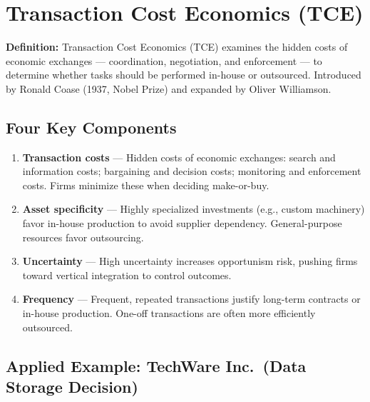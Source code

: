 \documentclass[11pt, letterpaper]{article}
\begin{document}
\newpage

\section{Transaction Cost Economics (TCE)}

\begin{defbox}
\textbf{Definition:} Transaction Cost Economics (TCE) examines the hidden costs of economic exchanges --- coordination, negotiation, and enforcement --- to determine whether tasks should be performed in-house or outsourced. Introduced by Ronald Coase (1937, Nobel Prize) and expanded by Oliver Williamson.
\end{defbox}

\subsection{Four Key Components}

\begin{enumerate}[leftmargin=*, label=\textbf{\arabic*.}]
  \item \textbf{Transaction costs} --- Hidden costs of economic exchanges: search and information costs; bargaining and decision costs; monitoring and enforcement costs. Firms minimize these when deciding make-or-buy.
  \item \textbf{Asset specificity} --- Highly specialized investments (e.g., custom machinery) favor in-house production to avoid supplier dependency. General-purpose resources favor outsourcing.
  \item \textbf{Uncertainty} --- High uncertainty increases opportunism risk, pushing firms toward vertical integration to control outcomes.
  \item \textbf{Frequency} --- Frequent, repeated transactions justify long-term contracts or in-house production. One-off transactions are often more efficiently outsourced.
\end{enumerate}

\subsection{Applied Example: TechWare Inc.\ (Data Storage Decision)}
\end{document}
